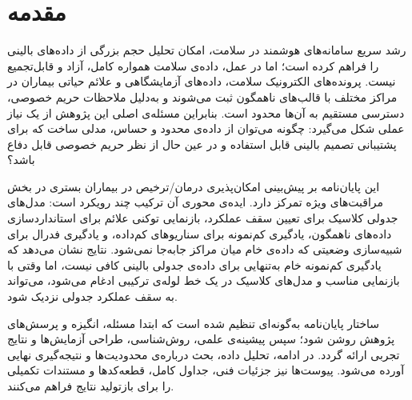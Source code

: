 \chapter*{مقدمه}

رشد سریع سامانه‌های هوشمند در سلامت، امکان تحلیل حجم بزرگی از داده‌های بالینی را فراهم کرده است؛ اما در عمل، داده‌ی سلامت همواره کامل، آزاد و قابل‌تجمیع نیست. پرونده‌های الکترونیک سلامت، داده‌های آزمایشگاهی و علائم حیاتی بیماران در مراکز مختلف با قالب‌های ناهمگون ثبت می‌شوند و به‌دلیل ملاحظات حریم خصوصی، دسترسی مستقیم به آن‌ها محدود است. بنابراین مسئله‌ی اصلی این پژوهش از یک نیاز عملی شکل می‌گیرد: چگونه می‌توان از داده‌ی محدود و حساس، مدلی ساخت که برای پشتیبانی تصمیم بالینی قابل استفاده و در عین حال از نظر حریم خصوصی قابل دفاع باشد؟

این پایان‌نامه بر پیش‌بینی امکان‌پذیری درمان/ترخیص در بیماران بستری در بخش مراقبت‌های ویژه تمرکز دارد. ایده‌ی محوری آن ترکیب چند رویکرد است: مدل‌های جدولی کلاسیک برای تعیین سقف عملکرد، بازنمایی توکنی علائم برای استانداردسازی داده‌های ناهمگون، یادگیری کم‌نمونه برای سناریوهای کم‌داده، و یادگیری فدرال برای شبیه‌سازی وضعیتی که داده‌ی خام میان مراکز جابه‌جا نمی‌شود. نتایج نشان می‌دهد که یادگیری کم‌نمونه خام به‌تنهایی برای داده‌ی جدولی بالینی کافی نیست، اما وقتی با بازنمایی مناسب و مدل‌های کلاسیک در یک خط لوله‌ی ترکیبی ادغام می‌شود، می‌تواند به سقف عملکرد جدولی نزدیک شود.

ساختار پایان‌نامه به‌گونه‌ای تنظیم شده است که ابتدا مسئله، انگیزه و پرسش‌های پژوهش روشن شود؛ سپس پیشینه‌ی علمی، روش‌شناسی، طراحی آزمایش‌ها و نتایج تجربی ارائه گردد. در ادامه، تحلیل داده، بحث درباره‌ی محدودیت‌ها و نتیجه‌گیری نهایی آورده می‌شود. پیوست‌ها نیز جزئیات فنی، جداول کامل، قطعه‌کدها و مستندات تکمیلی را برای بازتولید نتایج فراهم می‌کنند.

\cleardoublepage
